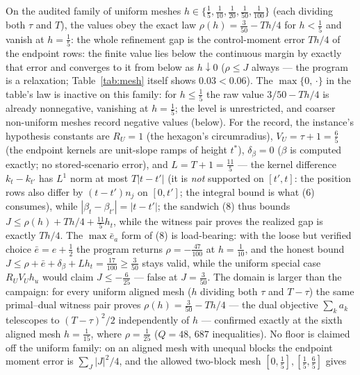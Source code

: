 \documentclass[10pt,twocolumn]{article}
\theoremstyle{plain}
\theoremstyle{definition}
\theoremstyle{remark}
\begin{document}
On the audited family of uniform meshes \(h \in \{\tfrac15,
\tfrac1{10}, \tfrac1{20}, \tfrac1{50}, \tfrac1{100}\}\) (each dividing
both \(\tau\) and \(T\)), the values obey the exact law \(\rho(h) =
\tfrac{3}{50} - Th/4\) for \(h < \tfrac15\) and vanish at \(h =
\tfrac15\): the whole refinement gap is the control-moment error \(Th/4\)
of the endpoint rows: the finite value lies below the continuous margin by
exactly that error and converges to it from below as \(h \downarrow 0\)
(\(\rho \le J\) always --- the program is a relaxation; Table~\ref{tab:mesh}
itself shows \(0.03 < 0.06\)). The \(\max\{0,\,\cdot\}\) in the
table's law is inactive on this family: for \(h \le \tfrac15\) the raw
value \(3/50 - Th/4\) is already nonnegative, vanishing at
\(h = \tfrac15\); the level is unrestricted, and coarser non-uniform
meshes record negative values (below).
For the record, the instance's hypothesis constants are
\(R_U = 1\) (the hexagon's circumradius), \(V_U = \tau + 1 = \tfrac65\)
(the endpoint kernels are unit-slope ramps of height \(t^{*}\)),
\(\delta_\beta = 0\) (\(\beta\) is computed exactly; no stored-scenario
error), and \(L = T + 1 = \tfrac{11}{5}\) --- the kernel difference \(k_t - k_{t'}\) has \(L^1\) norm at most
\(T|t - t'|\) (it is \emph{not} supported on \([t', t]\): the position
rows also differ by \((t - t')n_j\) on \([0, t']\); the integral bound is
what (6) consumes), while \(|\beta_t - \beta_{t'}| = |t - t'|\); the
sandwich (8) thus bounds \(J \le \rho(h) + Th/4 + \tfrac{11}{5}
h_t\), while the witness pair proves the realized gap is exactly
\(Th/4\). The \(\max \bar{e}_a\) form of (8) is load-bearing: with the
loose but verified choice \(\bar{e} = e + \tfrac12\) the program returns
\(\rho = -\tfrac{47}{100}\) at \(h = \tfrac1{10}\), and the honest
bound \(J \le \rho + \bar{e} + \delta_\beta + L h_t = \tfrac{17}{100}
\ge \tfrac3{50}\) stays valid, while the uniform special case
\(R_U V_U h_u\) would claim \(J \le -\tfrac{6}{25}\) --- false at
\(J = \tfrac3{50}\). The domain is larger than the campaign: for every uniform aligned mesh
(\(h\) dividing both \(\tau\) and \(T - \tau\)) the same primal--dual
witness pair proves \(\rho(h) = \tfrac{3}{50} - Th/4\) --- the dual
objective \(\sum_k a_k\) telescopes to \((T-\tau)^2/2\) independently of
\(h\) --- confirmed exactly at the sixth aligned mesh \(h = \tfrac1{15}\),
where \(\rho = \tfrac1{25}\) (\(Q = 48\), \(687\) inequalities). No
floor is claimed off the uniform family: on an aligned mesh with unequal
blocks the endpoint moment error is \(\sum_J |J|^2/4\), and the allowed
two-block mesh \([0, \tfrac15], [\tfrac15, \tfrac65]\) gives
\end{document}
